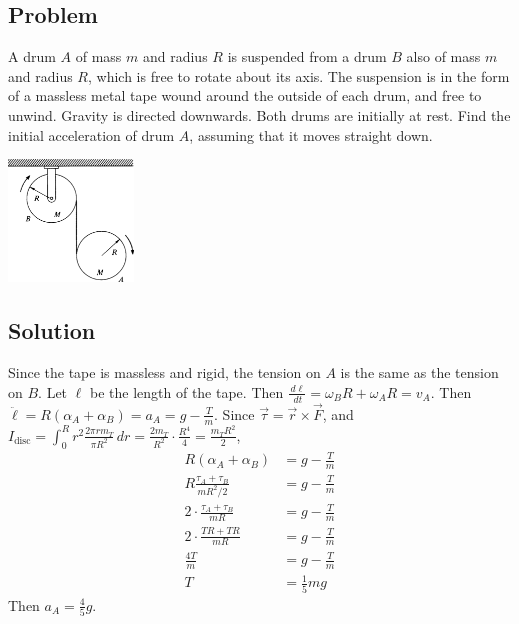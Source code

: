 \documentclass[solutions]{esg8012pset}
\renewcommand{\d}{\,d}
\begin{document}
\subsection*{Problem}
  A drum $A$ of mass $m$ and radius $R$ is suspended from a drum $B$ also of mass $m$ and radius $R$, which is free to rotate about its axis. The suspension is in the form of a massless metal tape wound around the outside of each drum, and free to unwind. Gravity is directed downwards. Both drums are initially at rest. Find the initial acceleration of drum $A$, assuming that it moves straight down.
  \begin{center}\includegraphics[width=0.25\textwidth]{ps09_3}\end{center}
\subsection*{Solution}

  Since the tape is massless and rigid, the tension on $A$ is the same as the tension on $B$.  Let $\ell$ be the length of the tape.  Then $\frac{\d \ell}{\d t} = \omega_B R + \omega_A R = v_A$.  Then $\ddot \ell = R (\alpha_A + \alpha_B) = a_A = g - \frac{T}{m}$.  Since $\vec \tau = \vec r \times \vec F$, and $I_{\text{disc}} = \int_0^R r^2 \frac{2\pi r m_T}{\pi R^2} \d r = \frac{2 m_T}{R^2} \cdot \frac{R^4}{4} = \frac{m_T R^2}{2}$, \begin{align*}
  R (\alpha_A + \alpha_B) & = g - \frac{T}{m} \\
  R \frac{\tau_A + \tau_B}{m R^2 / 2} & = g - \frac{T}{m} \\
  2\cdot \frac{\tau_A + \tau_B}{m R} & = g - \frac{T}{m} \\
  2\cdot \frac{T R + T R}{m R} & = g - \frac{T}{m} \\
  \frac{4T}{m} & = g - \frac{T}{m} \\
  T & = \frac{1}{5}m g
  \end{align*}  Then $a_A = \frac{4}{5}g$.
\end{document}
